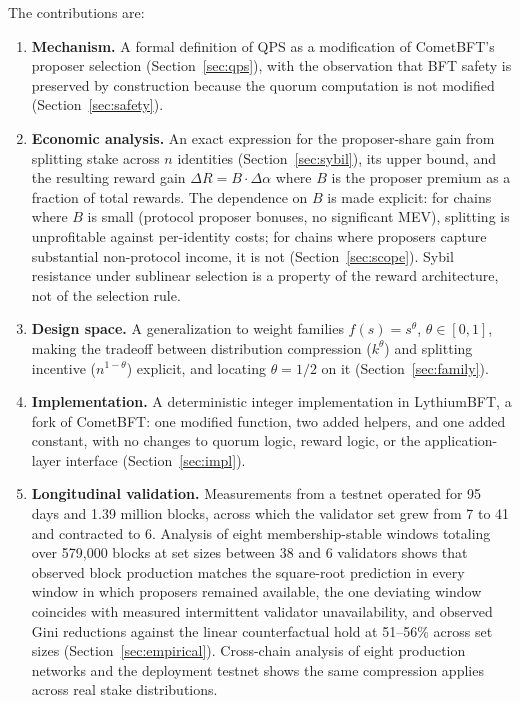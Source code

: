 \documentclass[11pt,a4paper]{article}
\begin{document}
The contributions are:

\begin{enumerate}
    \item \textbf{Mechanism.} A formal definition of QPS as a modification of CometBFT's proposer selection (Section~\ref{sec:qps}), with the observation that BFT safety is preserved by construction because the quorum computation is not modified (Section~\ref{sec:safety}).
    \item \textbf{Economic analysis.} An exact expression for the proposer-share gain from splitting stake across $n$ identities (Section~\ref{sec:sybil}), its upper bound, and the resulting reward gain $\Delta R = B \cdot \Delta\alpha$ where $B$ is the proposer premium as a fraction of total rewards. The dependence on $B$ is made explicit: for chains where $B$ is small (protocol proposer bonuses, no significant MEV), splitting is unprofitable against per-identity costs; for chains where proposers capture substantial non-protocol income, it is not (Section~\ref{sec:scope}). Sybil resistance under sublinear selection is a property of the reward architecture, not of the selection rule.
    \item \textbf{Design space.} A generalization to weight families $f(s) = s^\theta$, $\theta \in [0,1]$, making the tradeoff between distribution compression ($k^\theta$) and splitting incentive ($n^{1-\theta}$) explicit, and locating $\theta = 1/2$ on it (Section~\ref{sec:family}).
    \item \textbf{Implementation.} A deterministic integer implementation in LythiumBFT, a fork of CometBFT: one modified function, two added helpers, and one added constant, with no changes to quorum logic, reward logic, or the application-layer interface (Section~\ref{sec:impl}).
    \item \textbf{Longitudinal validation.} Measurements from a testnet operated for 95 days and 1.39 million blocks, across which the validator set grew from 7 to 41 and contracted to 6. Analysis of eight membership-stable windows totaling over 579{,}000 blocks at set sizes between 38 and 6 validators shows that observed block production matches the square-root prediction in every window in which proposers remained available, the one deviating window coincides with measured intermittent validator unavailability, and observed Gini reductions against the linear counterfactual hold at 51--56\% across set sizes (Section~\ref{sec:empirical}). Cross-chain analysis of eight production networks and the deployment testnet shows the same compression applies across real stake distributions.
\end{enumerate}
\end{document}
